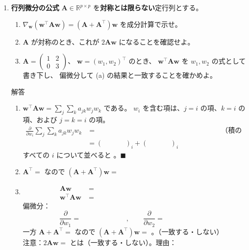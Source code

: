 \documentclass[a4paper,dvipdfmx]{jsarticle}
\newcommand{\提出期限}{2026年10月19日（月）}
\newcommand{\学籍番号}{0000000}
\newcommand{\氏名}{氏名を書く}
\newcommand{\提出日}{2026年10月19日}
\newenvironment{answer}{\begin{itembox}[l]{解答}}{\end{itembox}}
\begin{document}
\begin{enumerate}
  \item \textbf{行列微分の公式}\quad
    $\bm{A} \in \mathbb{R}^{p \times p}$ を\textbf{対称とは限らない}定行列とする。
    \begin{enumerate}
      \item $\nabla_{\bm{w}}(\bm{w}^\top\bm{A}\bm{w}) = (\bm{A} + \bm{A}^\top)\bm{w}$
        を成分計算で示せ。
      \item $\bm{A}$ が対称のとき、これが $2\bm{A}\bm{w}$ になることを確認せよ。
      \item $\bm{A} = \begin{pmatrix} 1 & 2 \\ 0 & 3 \end{pmatrix}$、
        $\bm{w} = (w_1, w_2)^\top$ のとき、
        $\bm{w}^\top\bm{A}\bm{w}$ を $w_1, w_2$ の式として書き下し、
        偏微分して (a) の結果と一致することを確かめよ。
    \end{enumerate}
    \begin{answer}
      \begin{enumerate}
        \item $\bm{w}^\top\bm{A}\bm{w} = \sum_{j}\sum_{k} a_{jk} w_j w_k$ である。
          $w_i$ を含む項は、$j = i$ の項、$k = i$ の項、および $j = k = i$ の項。
          \begin{align*}
            \frac{\partial}{\partial w_i} \sum_{j}\sum_{k} a_{jk} w_j w_k
              &= \phantom{XXXXXXXXXXXXXXXXXXXX} && \text{（積の微分）} \\
              &= (\phantom{XXXX})_i + (\phantom{XXXX})_i
          \end{align*}
          すべての $i$ について並べると \phantom{XXXXXXXXXXXX}。\hfill $\blacksquare$
        \item $\bm{A}^\top = $ \phantom{XX} なので $(\bm{A} + \bm{A}^\top)\bm{w} = $ \phantom{XXXXXXXX}
        \item
          \begin{align*}
            \bm{A}\bm{w} &= \phantom{XXXXXXXXXXXX} \\
            \bm{w}^\top\bm{A}\bm{w} &= \phantom{XXXXXXXXXXXXXXXXXXXX}
          \end{align*}
          偏微分：
          \begin{equation*}
            \frac{\partial}{\partial w_1} = \phantom{XXXXXXXX}, \qquad
            \frac{\partial}{\partial w_2} = \phantom{XXXXXXXX}
          \end{equation*}
          一方 $\bm{A} + \bm{A}^\top = $ \phantom{XXXXXXXX} なので
          $(\bm{A} + \bm{A}^\top)\bm{w} = $ \phantom{XXXXXXXXXXXX}。（一致する・しない）\\
          注意：$2\bm{A}\bm{w} = $ \phantom{XXXXXXXXXXXX} とは（一致する・しない）。理由：
      \end{enumerate}
    \end{answer}


\end{enumerate}
\end{document}
